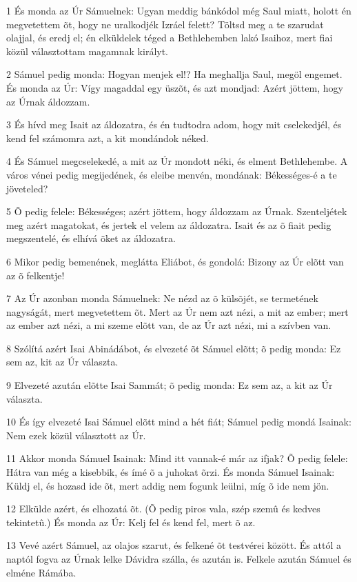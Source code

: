 \par 1 És monda az Úr Sámuelnek: Ugyan meddig bánkódol még Saul miatt, holott én megvetettem õt, hogy ne uralkodjék Izráel felett? Töltsd meg a te szarudat olajjal, és eredj el; én elküldelek téged a Bethlehemben lakó Isaihoz, mert fiai közül választottam magamnak királyt.
\par 2 Sámuel pedig monda: Hogyan menjek el!? Ha meghallja Saul, megöl engemet. És monda az Úr: Vígy magaddal egy üszõt, és azt mondjad: Azért jöttem, hogy az Úrnak áldozzam.
\par 3 És hívd meg Isait az áldozatra, és én tudtodra adom, hogy mit cselekedjél, és kend fel számomra azt, a kit mondándok néked.
\par 4 És Sámuel megcselekedé, a mit az Úr mondott néki, és elment Bethlehembe. A város vénei pedig megijedének, és eleibe menvén, mondának: Békességes-é a te jöveteled?
\par 5 Õ pedig felele: Békességes; azért jöttem, hogy áldozzam az Úrnak. Szenteljétek meg azért magatokat, és jertek el velem az áldozatra. Isait és az õ fiait pedig megszentelé, és elhívá õket az áldozatra.
\par 6 Mikor pedig bemenének, meglátta Eliábot, és gondolá: Bizony az Úr elõtt van az õ felkentje!
\par 7 Az Úr azonban monda Sámuelnek: Ne nézd az õ külsõjét, se termetének nagyságát, mert megvetettem õt. Mert az Úr nem azt nézi, a mit az ember; mert az ember azt nézi, a mi szeme elõtt van, de az Úr azt nézi, mi a szívben van.
\par 8 Szólítá azért Isai Abinádábot, és elvezeté õt Sámuel elõtt; õ pedig monda: Ez sem az, kit az Úr választa.
\par 9 Elvezeté azután elõtte Isai Sammát; õ pedig monda: Ez sem az, a kit az Úr választa.
\par 10 És így elvezeté Isai Sámuel elõtt mind a hét fiát; Sámuel pedig mondá Isainak: Nem ezek közül választott az Úr.
\par 11 Akkor monda Sámuel Isainak: Mind itt vannak-é már az ifjak? Õ pedig felele: Hátra van még a kisebbik, és ímé õ a juhokat õrzi. És monda Sámuel Isainak: Küldj el, és hozasd ide õt, mert addig nem fogunk leülni, míg õ ide nem jön.
\par 12 Elkülde azért, és elhozatá õt. (Õ pedig piros vala, szép szemû és kedves tekintetû.) És monda az Úr: Kelj fel és kend fel, mert õ az.
\par 13 Vevé azért Sámuel, az olajos szarut, és felkené õt testvérei között. És attól a naptól fogva az Úrnak lelke Dávidra szálla, és azután is. Felkele azután Sámuel és elméne Rámába.
